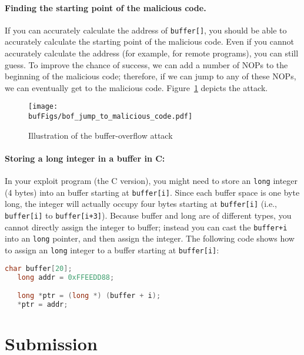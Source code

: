 \paragraph{Finding the starting point of the malicious code.}
If you can accurately calculate the address of {\tt buffer[]}, you should be 
able to accurately calculate the starting point of the malicious code.
Even if you cannot accurately calculate the address (for example, for remote programs),
you can still guess. To improve the chance of success, we can add a
number of NOPs to the beginning of the malicious code; therefore, if we 
can jump to any of these NOPs, we can eventually get to the 
malicious code. Figure~\ref{fig:buffer_overflow_jump_to_malicious} 
depicts the attack.

\begin{figure}[htb]
	\centering
	\texttt{[image: \\bufFigs/bof\_jump\_to\_malicious\_code.pdf]}
	\caption{Illustration of the buffer-overflow attack}
	\label{fig:buffer_overflow_jump_to_malicious}
\end{figure}


\paragraph{Storing a long integer in a buffer in C:} 
In your exploit program (the C version), you might need to store an {\tt long} 
integer (4 bytes) into an buffer starting at 
\texttt{buffer[i]}. 
Since each buffer space is one byte long,
the integer will actually occupy four bytes starting at \texttt{buffer[i]} (i.e.,
\texttt{buffer[i]} to \texttt{buffer[i+3]}). Because buffer and long are of different
types, you cannot directly assign the integer to buffer; instead you can 
cast the \texttt{buffer+i} into an {\tt long} pointer, and then assign the integer. The
following code shows how to assign an {\tt long} integer to a buffer
starting at \texttt{buffer[i]}:


\begin{lstlisting}[language=C]
   char buffer[20];
   long addr = 0xFFEEDD88;

   long *ptr = (long *) (buffer + i);
   *ptr = addr;
\end{lstlisting}


\section{Submission}




